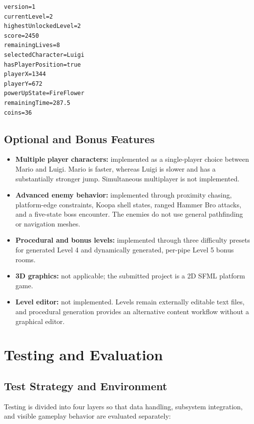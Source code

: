 \documentclass{template}
\begin{document}
\begin{lstlisting}[style=gamecode,numbers=none,caption={Example version-1 save record.}]
version=1
currentLevel=2
highestUnlockedLevel=2
score=2450
remainingLives=8
selectedCharacter=Luigi
hasPlayerPosition=true
playerX=1344
playerY=672
powerUpState=FireFlower
remainingTime=287.5
coins=36
\end{lstlisting}

\subsection{Optional and Bonus Features}

\begin{itemize}
    \item \textbf{Multiple player characters:} implemented as a single-player
          choice between Mario and Luigi. Mario is faster, whereas Luigi is
          slower and has a substantially stronger jump. Simultaneous
          multiplayer is not implemented.
    \item \textbf{Advanced enemy behavior:} implemented through proximity
          chasing, platform-edge constraints, Koopa shell states, ranged
          Hammer Bro attacks, and a five-state boss encounter. The enemies do
          not use general pathfinding or navigation meshes.
    \item \textbf{Procedural and bonus levels:} implemented through three
          difficulty presets for generated Level 4 and dynamically generated,
          per-pipe Level 5 bonus rooms.
    \item \textbf{3D graphics:} not applicable; the submitted project is a 2D
          SFML platform game.
    \item \textbf{Level editor:} not implemented. Levels remain externally
          editable text files, and procedural generation provides an
          alternative content workflow without a graphical editor.
\end{itemize}

\section{Testing and Evaluation}

\subsection{Test Strategy and Environment}

Testing is divided into four layers so that data handling, subsystem
integration, and visible gameplay behavior are evaluated separately:
\end{document}
